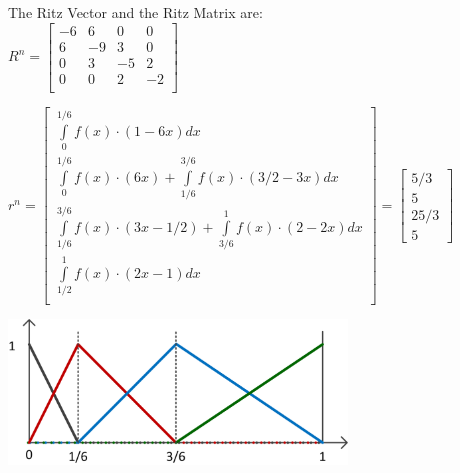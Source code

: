 \begin{minipage}{10cm}
The Ritz Vector and the Ritz Matrix are:\\

$R^n=
\begin{bmatrix}
		-6 & 6 & 0 & 0\\
		6 & -9 & 3 & 0\\
		0 & 3 & -5 & 2\\
		0 & 0 & 2 & -2\\
\end{bmatrix}$

$
r^n=\begin{bmatrix}
		\int\limits_{0}^{1/6}{f(x)\cdot(1-6x)}dx\\
		\int\limits_{0}^{1/6}{f(x)\cdot(6x)}+\int\limits_{1/6}^{3/6}{f(x)\cdot(3/2-3x)}dx\\
		\int\limits_{1/6}^{3/6}{f(x)\cdot(3x-1/2)}+\int\limits_{3/6}^{1}{f(x)\cdot(2-2x)}dx\\
		\int\limits_{1/2}^{1}{f(x)\cdot(2x-1)}dx\\
\end{bmatrix}=
\begin{bmatrix}
	5/3\\
	5\\
	25/3\\
	5
\end{bmatrix}
$\end{minipage}
\hfill
\begin{minipage}{9cm}
\includegraphics[width=9cm]{Content/02_numerics/FEMHand}
\end{minipage}\\


